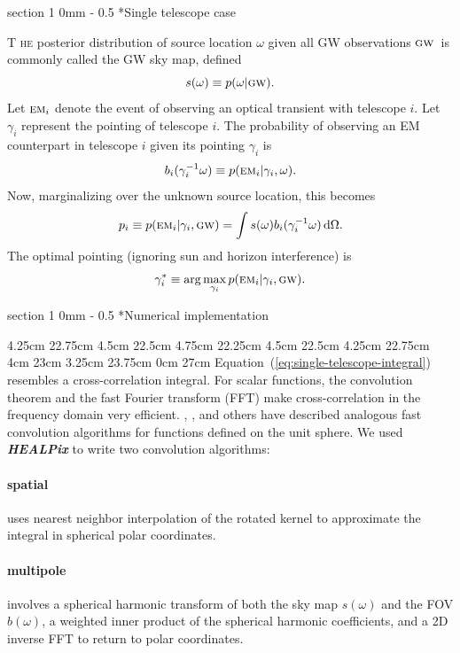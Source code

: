 \documentclass[landscape]{a0poster}
\makeatletter
\newcommand{\EM}[1]{\ensuremath{\textsc{\textrm{em}}_#1}}
\newcommand{\GW}{\ensuremath{\textsc{\textrm{gw}}}}
\newcommand{\dropcap}[2]{\lettrine{\fontspec{Copse}#1}{\textnormal{ #2}}}
\renewcommand{\section}{\@startsection
{section}%
{1}%
{0mm}%
{-\baselineskip}%
{0.5\baselineskip}%
{\fontspec{Marvel Bold}\Huge}} %
\renewcommand{\emph}[1]{{\bfseries\itshape#1}}
\makeatother
\begin{document}
\section*{Single telescope case}

\dropcap{T}{he} posterior distribution of source location $\omega$ given all GW observations \GW\ is commonly called the GW sky map, defined
%
$$
	s(\omega) \equiv p(\omega | \GW).
$$
%
Let $\EM{i}$ denote the event of observing an optical transient with telescope $i$.  Let $\gamma_i$ represent the pointing of telescope $i$.  The probability of observing an EM counterpart in telescope $i$ given its pointing $\gamma_i$ is
%
$$
	b_i(\gamma_i^{-1} \omega) \equiv p(\EM{i} | \gamma_i, \omega).
$$
%
Now, marginalizing over the unknown source location, this becomes
%
\begin{equation}
	\label{eq:single-telescope-integral}
	p_i \equiv p (\EM{i} | \gamma_i, \GW) = \int s(\omega) b_i(\gamma_i^{-1} \omega) \, \mathrm{d}\Omega.
\end{equation}
%
The optimal pointing (ignoring sun and horizon interference) is
%
$$
	\gamma_i^* \equiv \arg \max_{\gamma_i} p(\EM{i} | \gamma_i, \GW).
$$

\framebreak

\section*{\hspace{3cm}Numerical implementation}

	4.25cm 22.75cm
	4.5cm 22.5cm
	4.75cm 22.25cm
	4.5cm 22.5cm
	4.25cm 22.75cm
	4cm 23cm
	3.25cm 23.75cm
	0cm 27cm  
Equation~(\ref{eq:single-telescope-integral}) resembles a cross-correlation integral.  For scalar functions, the convolution theorem and the fast Fourier transform (FFT) make cross-correlation in the frequency domain very efficient.  \citet{Driscoll1994202}, \citet{Wandelt:2001p13439}, and others have described analogous fast convolution algorithms for functions defined on the unit sphere.  We used \emph{HEALPix} to write two convolution algorithms:

\paragraph{spatial}
uses nearest neighbor interpolation of the rotated kernel to approximate the integral in spherical polar coordinates.

\paragraph{multipole}
involves a spherical harmonic transform of both the sky map $s(\omega)$ and the FOV $b(\omega)$, a weighted inner product of the spherical harmonic coefficients, and a 2D inverse FFT to return to polar coordinates.\\
\end{document}
